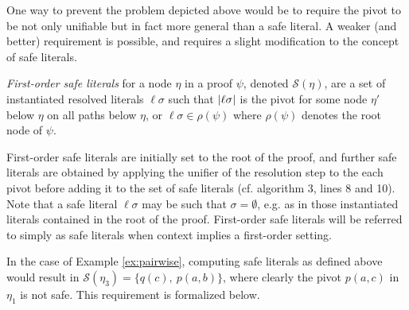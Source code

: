 One way to prevent the problem depicted above would be to require the pivot to be not only unifiable but in fact more general than a safe literal. A weaker (and better) requirement is possible, and requires a slight modification to the concept of safe literals. 


\begin{definition}
\emph{First-order safe literals} for a node $\eta$ in a proof $\psi$, denoted $\mathcal{S}(\eta)$, are a set of instantiated resolved literals $\ell\sigma$ such that $\lvert\ell\sigma\rvert$ is the pivot for some node $\eta'$ below $\eta$ on all paths below $\eta$, or $\ell\sigma \in \rho(\psi)$ where $\rho(\psi)$ denotes the root node of $\psi$.
\end{definition}

First-order safe literals are initially set to the root of the proof, and further safe literals are obtained by applying the unifier of the resolution step to the each pivot before adding it to the set of safe literals (cf. algorithm 3, lines 8 and 10). Note that a safe literal $\ell\sigma$ may be such that $\sigma=\emptyset$, e.g. as in those instantiated literals contained in the root of the proof. First-order safe literals will be referred to simply as safe literals when context implies a first-order setting.


 In the case of Example \ref{ex:pairwise}, computing safe literals as defined above would result in $\mathcal{S}(\eta_3)=\{q(c),~p(a,b)\}$, where clearly the pivot $p(a,c)$ in $\eta_1$ is not safe. This requirement is formalized below.




